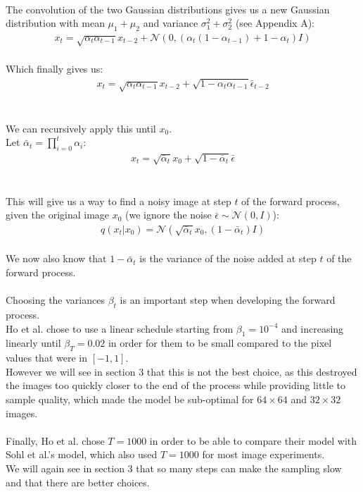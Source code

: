 \documentclass{article}
\begin{document}
\\
The convolution of the two Gaussian distributions gives us a new Gaussian distribution with mean $\mu_1 + \mu_2$ and variance $\sigma_1^2 + \sigma_2^2$ (see Appendix A):
\begin{align}
  x_t = \sqrt{\alpha_t \alpha_{t-1}} x_{t-2} + \mathcal{N}\left(0, \left(\alpha_t\left(1 - \alpha_{t-1}\right) + 1 - \alpha_t\right)I\right)
\end{align}
\\
Which finally gives us:
\begin{gather*}
  x_t = \sqrt{\alpha_t \alpha_{t-1}} x_{t-2} + \sqrt{1 - \alpha_t \alpha_{t-1}} \bar{\epsilon}_{t - 2}
\end{gather*}
\\\\
We can recursively apply this until $x_0$. \\
Let $\bar{\alpha}_t = \prod_{i=0}^{t}{\alpha_i}$:
\begin{gather}
  x_t = \sqrt{\bar{\alpha}_t} x_0 + \sqrt{1 - \bar{\alpha}_t} \bar{\epsilon}
\end{gather}
\\\\
This will give us a way to find a noisy image at step $t$ of the forward process, given the original image $x_0$ (we ignore the noise $\bar{\epsilon} \sim \mathcal{N}\left(0, I\right)$):
\begin{gather}
  q\left(x_t | x_0\right) = \mathcal{N}\left(\sqrt{\bar{\alpha}_t} x_0, \left(1 - \bar{\alpha}_t\right)I\right)
\end{gather}
\\
We now also know that $1 - \bar{\alpha}_t$ is the variance of the noise added at step $t$ of the forward process. \cite{nichol2021improved}
\\\\
Choosing the variances $\beta_t$ is an important step when developing the forward process. \\
Ho et al. \cite{ho2020denoising} chose to use a linear schedule starting from $\beta_1 = 10^{-4}$ and increasing linearly until $\beta_T = 0.02$ in order for them to be small compared to the pixel values that were in $\left[-1, 1\right]$. \cite{ho2020denoising} \\
However we will see in section 3 that this is not the best choice, as this destroyed the images too quickly closer to the end of the process while providing little to sample quality, which made the model be sub-optimal for $64 \times 64$ and $32 \times 32$ images. \cite{nichol2021improved}
\\\\
Finally, Ho et al. \cite{ho2020denoising} chose $T = 1000$ in order to be able to compare their model with Sohl et al.'s \cite{sohldickstein2015deep} model, which also used $T = 1000$ for most image experiments. \\
We will again see in section 3 that so many steps can make the sampling slow and that there are better choices. \cite{nichol2021improved}
\end{document}
